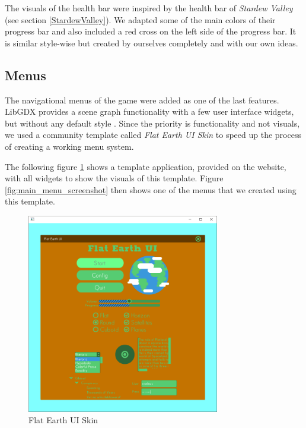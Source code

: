 \documentclass[12p]{article}
\begin{document}
The visuals of the health bar were inspired by the health bar of \emph{Stardew Valley} (see section \ref{StardewValley}). We adapted some of the main colors of their progress bar and also included a red cross on the left side of the progress bar. It is similar style-wise but created by ourselves completely and with our own ideas.


\subsection{Menus} \label{VisualDocMenus}

The navigational menus of the game were added as one of the last features. LibGDX provides a scene graph functionality with a few user interface widgets, but without any default style \cite{Scene2DUI}. Since the priority is functionality and not visuals, we used a community template called \emph{Flat Earth UI Skin} \cite{FlatEarthUISkin} to speed up the process of creating a working menu system.

The following figure \ref{fig:flat_earth_ui_skin} shows a template application, provided on the website, with all widgets to show the visuals of this template. Figure \ref{fig:main_menu_screenshot} then shows one of the menus that we created using this template.

\begin{figure}[ht]
 \center
 \includegraphics[width=0.75\textwidth]{Documentation/preview.png}
 \caption{Flat Earth UI Skin \cite{FlatEarthUISkin}}
 \label{fig:flat_earth_ui_skin}
\end{figure}
\end{document}
